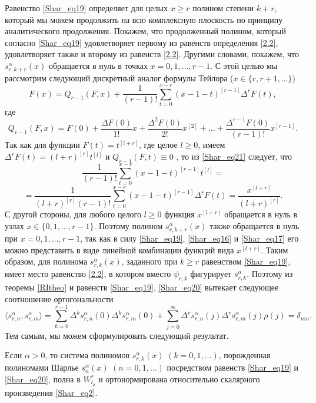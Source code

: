 Равенство \eqref{Shar_eq19} определяет для целых $x\geq r$ полином степени $k+r$, который мы можем продолжить на всю комплексную плоскость по принципу аналитического продолжения. Покажем, что продолженный полином, который согласно \eqref{Shar_eq19} удовлетворяет первому из равенств определения \eqref{2.2}, удовлетворяет также и второму из равенств \eqref{2.2}. Другими словами, покажем, что $s_{r,k+r}^{\alpha}(x)$ обращается в нуль в точках $x=0,1,\ldots,r-1$. С этой целью мы рассмотрим следующий дискретный аналог формулы Тейлора ($x\in\{r,r+1,\ldots\}$)
\begin{equation}\label{Shar_eq21}
F(x)=Q_{r-1}(F,x) + \frac{1}{(r-1)!}\sum_{t=0}^{x-r} (x-1-t)^{[r-1]}\Delta^rF(t),
\end{equation}
где
\begin{equation}\label{Shar_eq22}
Q_{r-1}(F,x)= F(0)+\frac{\Delta F(0)}{1!}x+\frac{\Delta^2 F(0)}{2!}
x^{[2]}+\ldots+\frac{\Delta^{r-1} F(0)}{(r-1)!}x^{[r-1]}.
\end{equation}
Так как для функции $F(t)=t^{[l+r]}$, где целое $l\ge0$, имеем $\Delta^r F(t)=(l+r)^{[r]}t^{[l]}$ и $Q_{r-1}(F,t)\equiv0$ , то из \eqref{Shar_eq21} следует, что
$$ \frac{1}{(r-1)!}\sum_{t=0}^{x-r} (x-1-t)^{[r-1]}t^{[l]}= $$
\begin{equation}\label{Shar_eq23}
= \frac{1}{(l+r)^{[r]}(r-1)!}\sum_{t=0}^{x-r} (x-1-t)^{[r-1]}\Delta^rF(t)=\frac{x^{[l+r]}}{(l+r)^{[r]}}.
\end{equation}
С другой стороны, для любого целого $l\geq 0$ функция $x^{[l+r]}$ обращается в нуль в узлах $x\in\{0,1,\ldots,r-1\}$. Поэтому полином $s_{r,k+r}^{\alpha}(x)$ также обращается в нуль при $x=0,1,\ldots,r-1$, так как в силу \eqref{Shar_eq19}, \eqref{Shar_eq16} и \eqref{Shar_eq17} его можно представить в виде линейной комбинации функций вида $x^{[l+r]}$. Таким образом, для полинома $s_{r,k}^{\alpha}(x)$, заданного при $k\geq r$ равенством \eqref{Shar_eq19}, имеет место равенство \eqref{2.2}, в котором вместо $\psi_{r,k}$ фигурирует $s_{r,k}^\alpha$. Поэтому из теоремы \ref{RItheo} и равенств \eqref{Shar_eq19}, \eqref{Shar_eq20} вытекает следующее соотношение ортогональности
$$ \langle s^\alpha_{r,n},s^\alpha_{r,m} \rangle =\sum_{k=0}^{r-1}\Delta^ks^\alpha_{r,n}(0)\Delta^ks^\alpha_{r,m}(0) + \sum_{j=0}^\infty\Delta^rs^\alpha_{r,n}(j)\Delta^rs^\alpha_{r,m}(j)\rho(j) = \delta_{nm}. $$
Тем самым, мы можем сформулировать следующий результат.
\begin{theorem}\label{Shar_thm2}
	Если $\alpha>0$, то система полиномов $s_{r,k}^{\alpha}(x)$ $(k=0, 1,\ldots)$, порожденная полиномами Шарлье $s_n^{\alpha}(x)$ $(n=0,1,\ldots)$ посредством равенств \eqref{Shar_eq19} и \eqref{Shar_eq20}, полна в $W^r_{l_\rho}$ и ортонормирована относительно скалярного произведения \eqref{Shar_eq2}.
\end{theorem}


